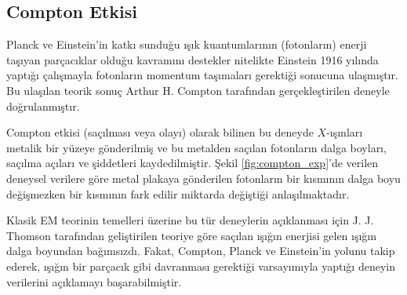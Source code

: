 \documentclass[00_kitap.tex]{subfiles}
\begin{document}
\subsection{Compton Etkisi}
Planck ve Einstein'in katkı sunduğu ışık kuantumlarının (fotonların) enerji taşıyan parçacıklar olduğu kavramını destekler nitelikte Einstein 1916 yılında yaptığı çalışmayla fotonların momentum taşımaları gerektiği sonucuna ulaşmıştır. Bu ulaşılan teorik sonuç Arthur H. Compton tarafından gerçekleştirilen deneyle doğrulanmıştır.

Compton etkisi (saçılması veya olayı) olarak bilinen bu deneyde $X$-ışınları metalik bir yüzeye gönderilmiş ve bu metalden saçılan fotonların dalga boyları, saçılma açıları ve şiddetleri kaydedilmiştir. Şekil \ref{fig:compton_exp}'de verilen deneysel verilere göre metal plakaya gönderilen fotonların bir kısmının dalga boyu değişmezken bir kısmının fark edilir miktarda değiştiği anlaşılmaktadır.

Klasik EM teorinin temelleri üzerine bu tür deneylerin açıklanması için J. J. Thomson \cite{Thomson1906}  tarafından geliştirilen teoriye göre saçılan ışığın enerjisi gelen ışığın dalga boyundan bağımsızdı. Fakat, Compton, Planck ve Einstein'in yolunu takip ederek, ışığın bir parçacık gibi davranması gerektiği varsayımıyla yaptığı deneyin verilerini açıklamayı başarabilmiştir.
\end{document}
